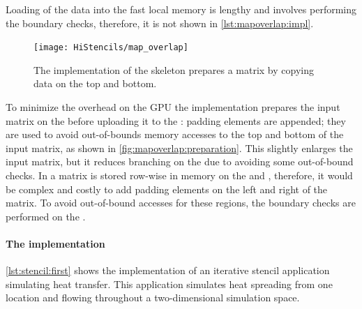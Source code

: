 Loading of the data into the fast local memory is lengthy and involves performing the boundary checks, therefore, it is not shown in \autoref{lst:mapoverlap:impl}.
%
\begin{figure}
  \begin{centering}
    \texttt{[image: HiStencils/map\_overlap]}
    \caption{The  implementation of the \stencil skeleton prepares a matrix by copying data on the top and bottom.}
    \label{fig:mapoverlap:preparation}
    \vspace{-.5em}
  \end{centering}
\end{figure}
%
To minimize the overhead on the GPU the  implementation prepares the input matrix on the \CPU before uploading it to the \GPU:
padding elements are appended; they are used to avoid out-of-bounds memory accesses to the top and bottom of the input matrix, as shown in \autoref{fig:mapoverlap:preparation}.
This slightly enlarges the input matrix, but it reduces branching on the \GPU due to avoiding some out-of-bound checks.
In \SkelCL a matrix is stored row-wise in memory on the \CPU and \GPU, therefore, it would be complex and costly to add padding elements on the left and right of the matrix.
To avoid out-of-bound accesses for these regions, the boundary checks are performed on the \GPU.

\paragraph{The  implementation}

\autoref{lst:stencil:first} shows the implementation of an iterative stencil application simulating heat transfer.
This application simulates heat spreading from one location and flowing throughout a two-dimensional simulation space.

